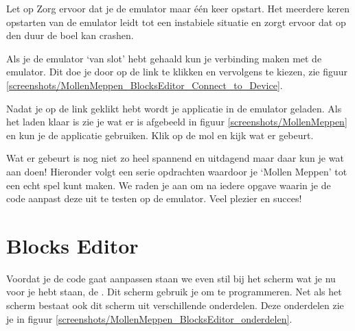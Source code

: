 \begin{derivation}{Let op}
Zorg ervoor dat je de emulator maar \'e\'en keer opstart. Het meerdere keren opstarten van de emulator leidt tot een instabiele situatie en zorgt ervoor dat op den duur de boel kan crashen.
\end{derivation}


Als je de emulator `van slot' hebt gehaald kun je verbinding maken met de emulator. Dit doe je door op de  link te klikken en vervolgens  te kiezen, zie figuur \ref{screenshots/MollenMeppen_BlocksEditor_Connect_to_Device}.


Nadat je op de link geklikt hebt wordt je applicatie in de emulator geladen. Als het laden klaar is zie je wat er is afgebeeld in figuur \ref{screenshots/MollenMeppen} en kun je de applicatie gebruiken. Klik op de mol en kijk wat er gebeurt.
 
Wat er gebeurt is nog niet zo heel spannend en uitdagend maar daar kun je wat aan doen! Hieronder volgt een serie opdrachten waardoor je `Mollen Meppen' tot een echt spel kunt maken. We raden je aan om na iedere opgave waarin je de code aanpast deze uit te testen op de emulator. Veel plezier en succes!


\section{Blocks Editor}
Voordat je de code gaat aanpassen staan we even stil bij het scherm wat je nu voor je hebt staan, de . Dit scherm gebruik je om te programmeren. Net als het  scherm bestaat ook dit scherm uit verschillende onderdelen. Deze onderdelen zie je in figuur \ref{screenshots/MollenMeppen_BlocksEditor_onderdelen}.



